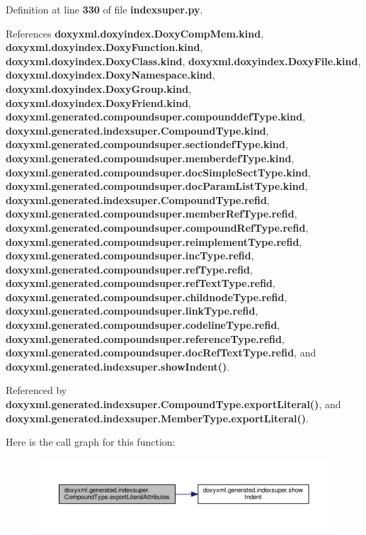 Definition at line {\bf 330} of file {\bf indexsuper.\+py}.



References {\bf doxyxml.\+doxyindex.\+Doxy\+Comp\+Mem.\+kind}, {\bf doxyxml.\+doxyindex.\+Doxy\+Function.\+kind}, {\bf doxyxml.\+doxyindex.\+Doxy\+Class.\+kind}, {\bf doxyxml.\+doxyindex.\+Doxy\+File.\+kind}, {\bf doxyxml.\+doxyindex.\+Doxy\+Namespace.\+kind}, {\bf doxyxml.\+doxyindex.\+Doxy\+Group.\+kind}, {\bf doxyxml.\+doxyindex.\+Doxy\+Friend.\+kind}, {\bf doxyxml.\+generated.\+compoundsuper.\+compounddef\+Type.\+kind}, {\bf doxyxml.\+generated.\+indexsuper.\+Compound\+Type.\+kind}, {\bf doxyxml.\+generated.\+compoundsuper.\+sectiondef\+Type.\+kind}, {\bf doxyxml.\+generated.\+compoundsuper.\+memberdef\+Type.\+kind}, {\bf doxyxml.\+generated.\+compoundsuper.\+doc\+Simple\+Sect\+Type.\+kind}, {\bf doxyxml.\+generated.\+compoundsuper.\+doc\+Param\+List\+Type.\+kind}, {\bf doxyxml.\+generated.\+indexsuper.\+Compound\+Type.\+refid}, {\bf doxyxml.\+generated.\+compoundsuper.\+member\+Ref\+Type.\+refid}, {\bf doxyxml.\+generated.\+compoundsuper.\+compound\+Ref\+Type.\+refid}, {\bf doxyxml.\+generated.\+compoundsuper.\+reimplement\+Type.\+refid}, {\bf doxyxml.\+generated.\+compoundsuper.\+inc\+Type.\+refid}, {\bf doxyxml.\+generated.\+compoundsuper.\+ref\+Type.\+refid}, {\bf doxyxml.\+generated.\+compoundsuper.\+ref\+Text\+Type.\+refid}, {\bf doxyxml.\+generated.\+compoundsuper.\+childnode\+Type.\+refid}, {\bf doxyxml.\+generated.\+compoundsuper.\+link\+Type.\+refid}, {\bf doxyxml.\+generated.\+compoundsuper.\+codeline\+Type.\+refid}, {\bf doxyxml.\+generated.\+compoundsuper.\+reference\+Type.\+refid}, {\bf doxyxml.\+generated.\+compoundsuper.\+doc\+Ref\+Text\+Type.\+refid}, and {\bf doxyxml.\+generated.\+indexsuper.\+show\+Indent()}.



Referenced by {\bf doxyxml.\+generated.\+indexsuper.\+Compound\+Type.\+export\+Literal()}, and {\bf doxyxml.\+generated.\+indexsuper.\+Member\+Type.\+export\+Literal()}.



Here is the call graph for this function\+:
\nopagebreak
\begin{figure}[H]
\begin{center}
\leavevmode
\includegraphics[width=350pt]{d6/db9/classdoxyxml_1_1generated_1_1indexsuper_1_1CompoundType_abb541f12931fcd7908ef6f790cd0ca2a_cgraph}
\end{center}
\end{figure}




